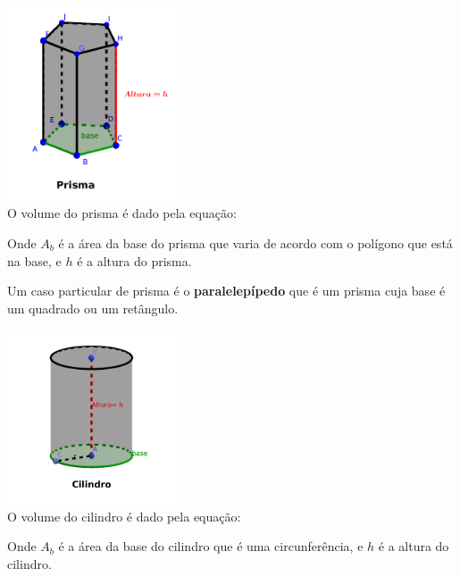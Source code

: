 \begin{multicols}{2}
 \includegraphics[width=5cm]{./cap_geometria/figs/prisma_pentagono} \\
 O volume do prisma é dado pela equação:
 

 Onde $A_b$ é a área da base do prisma que varia de acordo com o polígono que está na base, e $h$ é a altura do prisma.

 Um caso particular de prisma é o \textbf{paralelepípedo} que é um prisma cuja base é um quadrado ou um retângulo.
\end{multicols}

\begin{multicols}{2}
 \includegraphics[width=5cm]{./cap_geometria/figs/cilindro} \\
 O volume do cilindro é dado pela equação:
 

 Onde $A_b$ é a área da base do cilindro que é uma circunferência, e $h$ é a altura do cilindro.
\end{multicols}


